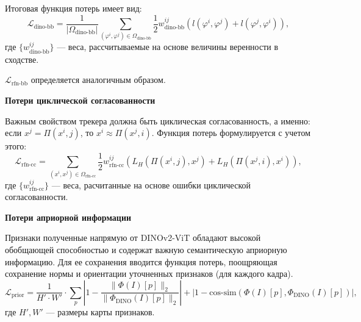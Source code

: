 \documentclass[a4paper, 14pt]{extarticle}
\theoremstyle{definition}
\theoremstyle{plain}
\theoremstyle{remark}
\begin{document}
Итоговая функция потерь имеет вид:
\begin{equation}
	\mathcal{L}_{\text{dino-bb}} = \frac{1}{|\Omega_{\text{dino-bb}}|} \sum_{(\varphi^i, \varphi^j) \in \Omega_{\text{dino-bb}}} \frac{1}{2} w_{\text{dino-bb}}^{ij} \left( l(\varphi^i, \varphi^j) + l(\varphi^j, \varphi^i) \right),
\end{equation}
где $\{w_{\text{dino-bb}}^{ij}\}$ --- веса, рассчитываемые на основе величины веренности в сходстве.

$\mathcal{L}_{\text{rfn-bb}}$ определяется аналогичным образом.

\textbf{Потери циклической согласованности}

Важным свойством трекера должна быть циклическая согласованность, а именно: если $x^j = \Pi(x^i,j)$, то $x^i\approx\Pi(x^j,i)$. Функция потерь формулируется с учетом этого:
\begin{equation}
	\mathcal{L}_{\text{rfn-cc}} = \sum_{(x^i, x^j) \in \Omega_{\text{rfn-cc}}} \frac{1}{2} w_{\text{rfn-cc}}^{ij} \left( L_H(\Pi(x^i, j), x^j) + L_H(\Pi(x^j, i), x^i) \right),
\end{equation}
где $\{w_{\text{rfn-cc}}^{ij}\}$ --- веса, расчитанные на основе ошибки циклической согласованности.

\textbf{Потери априорной информации}

Признаки полученные напрямую от DINOv2-ViT обладают высокой обобщающей способностью и содержат важную семантическую априорную информацию. Для ее сохранения вводится функция потерь, поощряющая сохранение нормы и ориентации уточненных признаков (для каждого кадра).
\begin{equation}
	\mathcal{L}_{\text{prior}} = \frac{1}{H' \cdot W'} \cdot \sum_p \left| 1 - \frac{\|\Phi(I)[p]\|_2}{\|\Phi_{\text{DINO}}(I)[p]\|_2}\right| + \left| 1 - \text{cos-sim}(\Phi(I)[p], \Phi_{\text{DINO}}(I)[p])\right|,
\end{equation}
где $H', W'$ --- размеры карты признаков.
\end{document}
